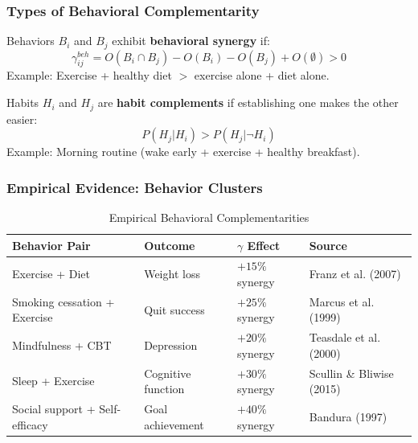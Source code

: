 \subsubsection{Types of Behavioral Complementarity}

\begin{definition}
Behaviors $B_i$ and $B_j$ exhibit \textbf{behavioral synergy} if:
\begin{equation}
\gamma^{beh}_{ij} = O(B_i \cap B_j) - O(B_i) - O(B_j) + O(\emptyset) > 0
\end{equation}
Example: Exercise + healthy diet $>$ exercise alone + diet alone.
\end{definition}

\begin{definition}
Habits $H_i$ and $H_j$ are \textbf{habit complements} if establishing one makes the other easier:
\begin{equation}
P(H_j | H_i) > P(H_j | \neg H_i)
\end{equation}
Example: Morning routine (wake early + exercise + healthy breakfast).
\end{definition}

\subsubsection{Empirical Evidence: Behavior Clusters}

\begin{table}[h]
\centering
\caption{Empirical Behavioral Complementarities}
\label{tab:behavior-gamma}
\renewcommand{\arraystretch}{1.2}
\small
\begin{tabular}{@{}p{4cm}p{2.5cm}p{2cm}l@{}}
\toprule
\textbf{Behavior Pair} & \textbf{Outcome} & \textbf{$\gamma$ Effect} & \textbf{Source} \\
\midrule
Exercise + Diet & Weight loss & $+15\%$ synergy & Franz et al. (2007) \\
Smoking cessation + Exercise & Quit success & $+25\%$ synergy & Marcus et al. (1999) \\
Mindfulness + CBT & Depression & $+20\%$ synergy & Teasdale et al. (2000) \\
Sleep + Exercise & Cognitive function & $+30\%$ synergy & Scullin \& Bliwise (2015) \\
Social support + Self-efficacy & Goal achievement & $+40\%$ synergy & Bandura (1997) \\
\bottomrule
\end{tabular}
\end{table}

